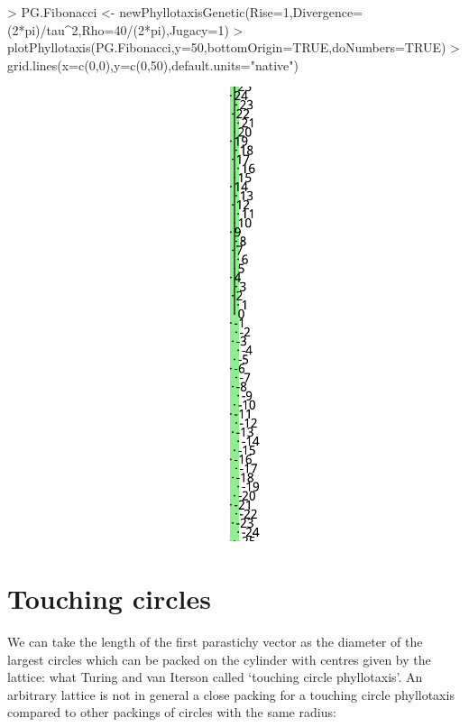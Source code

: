 \documentclass[a4paper]{article}
\begin{document}
\begin{Schunk}
\begin{Sinput}
> PG.Fibonacci <-  newPhyllotaxisGenetic(Rise=1,Divergence=(2*pi)/tau^2,Rho=40/(2*pi),Jugacy=1)
> plotPhyllotaxis(PG.Fibonacci,y=50,bottomOrigin=TRUE,doNumbers=TRUE)
> grid.lines(x=c(0,0),y=c(0,50),default.units="native")
\end{Sinput}
\end{Schunk}
\includegraphics{figdir/fig-fibfig}



\section{Touching circles}
We can take the length of the first parastichy vector as the diameter
of the largest  circles which can be packed on the cylinder with centres given by the lattice:
what Turing and van Iterson called `touching circle phyllotaxis'.
An arbitrary lattice is not in general a close packing for a touching circle phyllotaxis compared to other packings of circles
with the same radius:
\end{document}
